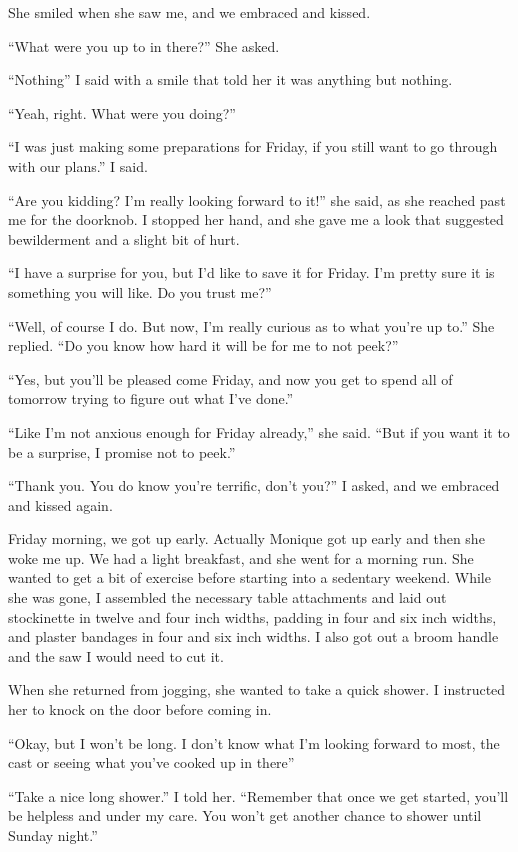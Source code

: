 She smiled when she saw me, and we embraced and kissed.

``What were you up to in there?'' She asked.

``Nothing'' I said with a smile that told her it was anything but nothing.

``Yeah, right. What were you doing?''

``I was just making some preparations for Friday, if you still want to go through with our
plans.'' I said.

``Are you kidding? I'm really looking forward to it!'' she said, as she reached past me for
the doorknob. I stopped her hand, and she gave me a look that suggested bewilderment and a
slight bit of hurt.

``I have a surprise for you, but I'd like to save it for Friday. I'm pretty sure it is
something you will like. Do you trust me?''

``Well, of course I do. But now, I'm really curious as to what you're up to.'' She replied.
``Do you know how hard it will be for me to not peek?''

``Yes, but you'll be pleased come Friday, and now you get to spend all of tomorrow trying to
figure out what I've done.''

``Like I'm not anxious enough for Friday already,'' she said. ``But if you want it to be a
surprise, I promise not to peek.''

``Thank you. You do know you're terrific, don't you?'' I asked, and we embraced and kissed
again.

Friday morning, we got up early. Actually Monique got up early and then she woke me up. We
had a light breakfast, and she went for a morning run. She wanted to get a bit of exercise
before starting into a sedentary weekend. While she was gone, I assembled the necessary table
attachments and laid out stockinette in twelve and four inch widths, padding in four and six
inch widths, and plaster bandages in four and six inch widths. I also got out a broom handle and
the saw I would need to cut it.

When she returned from jogging, she wanted to take a quick shower. I instructed her to
knock on the door before coming in.

``Okay, but I won't be long. I don't know what I'm looking forward to most, the cast or
seeing what you've cooked up in there''

``Take a nice long shower.'' I told her. ``Remember that once we get started, you'll be
helpless and under my care. You won't get another chance to shower until Sunday night.''

